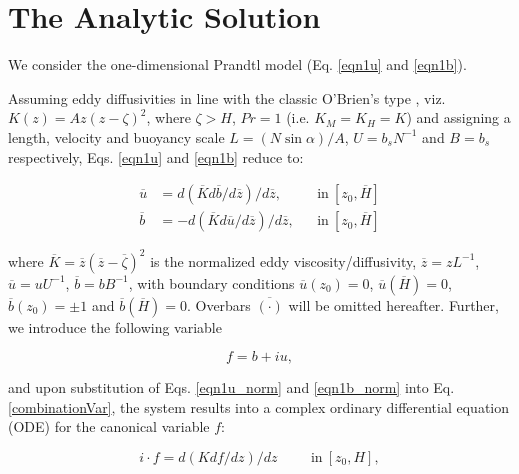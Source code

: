 \section{The Analytic Solution}
%
We consider the one-dimensional Prandtl model (Eq. \ref{eqn1u} and \ref{eqn1b}). 

Assuming eddy diffusivities in line with the classic O'Brien's type \citep{O'Brien1970}, viz. $K(z) = A z(z-\zeta)^2$, where $\zeta>H$, $Pr=1$ (i.e. $K_M=K_H=K$) and assigning a length, velocity and buoyancy scale $L= (N \sin{\alpha})/ A$, $U=b_s N^{-1}$ and $B=b_s$ respectively, Eqs. \ref{eqn1u} and \ref{eqn1b} reduce to:
%
\begin{linenomath*}
\begin{subequations}
\label{ode}
\begin{align}
	\overline{u} & = d( \overline{K} d\overline{b}/d\overline{z} )/d\overline{z}, && \mathrm{in}  \ [z_0,\overline{H}]
	\label{eqn1u_norm} \\
	\overline{b} & = -d( \overline{K} d\overline{u}/d\overline{z} )/d\overline{z}, &&\mathrm{in}  \ [z_0,\overline{H}]
	\label{eqn1b_norm}
\end{align}
\end{subequations}
\end{linenomath*}
%
where $\overline{K} = \overline{z}(\overline{z}-\overline{\zeta})^2$ is the normalized eddy viscosity/diffusivity, $\overline{z}=zL^{-1}$, $\overline{u} = uU^{-1}$, $\overline{b}=b B^{-1}$, with boundary conditions $\overline{u}(z_0)=0$, $\overline{u}(\overline{H}) = 0$, $\overline{b}(z_0)=\pm 1$ and $\overline{b}(\overline{H}) = 0$.
Overbars $\overline{(\cdot)}$ will be omitted hereafter.
%
Further, we introduce the following variable
%
\begin{linenomath*}
\begin{equation}
   f= b + i u,
   \label{combinationVar}
\end{equation}
\end{linenomath*}
%
and upon substitution of Eqs. \ref{eqn1u_norm} and \ref{eqn1b_norm} into Eq. \ref{combinationVar}, the system results into a complex ordinary differential equation (ODE) for the canonical variable $f$:
%
\begin{linenomath*}
\label{ode_norm}
\begin{equation}
	i \cdot f =  d(  K df/dz )/dz \hspace{1cm} \mathrm{in}  \ [z_0,H],
	\label{ode}
\end{equation}
\end{linenomath*}
